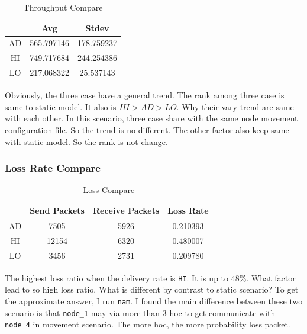 \begin{table}[H]
    \centering
    \setlength{\extrarowheight}{2mm}
    \addtolength{\tabcolsep}{3mm}
    \begin{tabular}{c c c}
        \hline \hline
        &  Avg & Stdev \\
        \hline
        AD & 565.797146 & 178.759237 \\
        HI & 749.717684 & 244.254386 \\
        LO & 217.068322 & 25.537143 \\
        \hline
    \end{tabular}
    \caption{Throughput Compare}
\end{table}

Obviously, the three case have a general trend. The rank among three case is same to static model. It also is $HI>AD>LO$. Why their vary trend are same with each other. In this scenario, three case share with the same node movement configuration file. So the trend is no different. The other factor also keep same with static model. So the rank is not change. 

\subsubsection{Loss Rate Compare}
\begin{table}[H]
    \centering
    \setlength{\extrarowheight}{2mm}
    \addtolength{\tabcolsep}{3mm}
    \begin{tabular}{c c c c}
        \hline \hline
        &  Send Packets & Receive Packets & Loss Rate \\
        \hline
        AD & 7505 & 5926 & 0.210393 \\
        HI & 12154 & 6320 & 0.480007 \\
        LO & 3456 & 2731 &  0.209780 \\
        \hline
    \end{tabular}
    \caption{Loss Compare}
\end{table}

The highest loss ratio when the delivery rate is \verb|HI|. It is up to $48\%$. What factor lead to so high loss ratio. What is different by contrast to static scenario? To get the approximate answer, I run \verb|nam|. I found the main difference between these two scenario is that \verb|node_1| may via more than 3 hoc to get communicate with \verb|node_4| in movement scenario. The more hoc, the more probability loss packet. 

